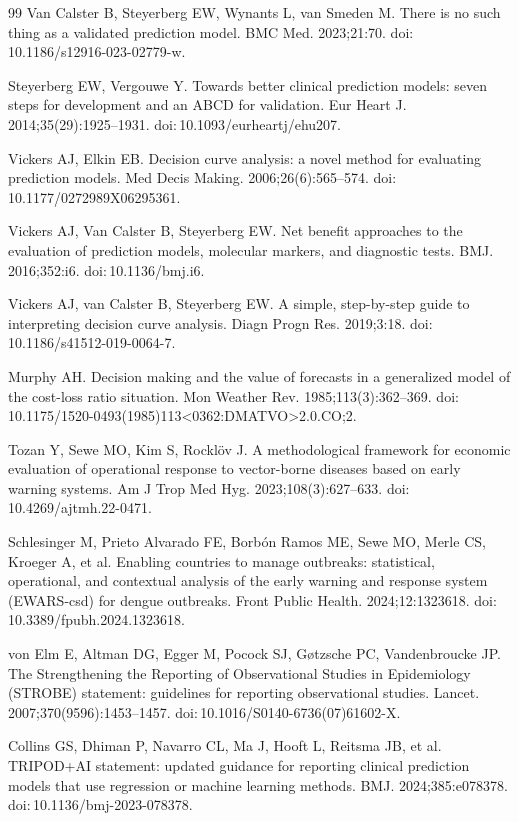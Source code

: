 \documentclass[11pt,a4paper]{article}
\begin{document}
\begin{thebibliography}{99}
 Van Calster B, Steyerberg EW, Wynants L, van Smeden M. There is no such thing as a validated prediction model. BMC Med. 2023;21:70. doi:\,10.1186/s12916-023-02779-w.

 Steyerberg EW, Vergouwe Y. Towards better clinical prediction models: seven steps for development and an ABCD for validation. Eur Heart J. 2014;35(29):1925--1931. doi:\,10.1093/eurheartj/ehu207.

 Vickers AJ, Elkin EB. Decision curve analysis: a novel method for evaluating prediction models. Med Decis Making. 2006;26(6):565--574. doi:\,10.1177/0272989X06295361.

 Vickers AJ, Van Calster B, Steyerberg EW. Net benefit approaches to the evaluation of prediction models, molecular markers, and diagnostic tests. BMJ. 2016;352:i6. doi:\,10.1136/bmj.i6.

 Vickers AJ, van Calster B, Steyerberg EW. A simple, step-by-step guide to interpreting decision curve analysis. Diagn Progn Res. 2019;3:18. doi:\,10.1186/s41512-019-0064-7.

 Murphy AH. Decision making and the value of forecasts in a generalized model of the cost-loss ratio situation. Mon Weather Rev. 1985;113(3):362--369. doi:\,10.1175/1520-0493(1985)113\textless0362:DMATVO\textgreater2.0.CO;2.

 Tozan Y, Sewe MO, Kim S, Rockl\"ov J. A methodological framework for economic evaluation of operational response to vector-borne diseases based on early warning systems. Am J Trop Med Hyg. 2023;108(3):627--633. doi:\,10.4269/ajtmh.22-0471.

 Schlesinger M, Prieto Alvarado FE, Borb\'on Ramos ME, Sewe MO, Merle CS, Kroeger A, et al. Enabling countries to manage outbreaks: statistical, operational, and contextual analysis of the early warning and response system (EWARS-csd) for dengue outbreaks. Front Public Health. 2024;12:1323618. doi:\,10.3389/fpubh.2024.1323618.

 von Elm E, Altman DG, Egger M, Pocock SJ, G\o tzsche PC, Vandenbroucke JP. The Strengthening the Reporting of Observational Studies in Epidemiology (STROBE) statement: guidelines for reporting observational studies. Lancet. 2007;370(9596):1453--1457. doi:\,10.1016/S0140-6736(07)61602-X.

 Collins GS, Dhiman P, Navarro CL, Ma J, Hooft L, Reitsma JB, et al. TRIPOD+AI statement: updated guidance for reporting clinical prediction models that use regression or machine learning methods. BMJ. 2024;385:e078378. doi:\,10.1136/bmj-2023-078378.


\end{thebibliography}
\end{document}
